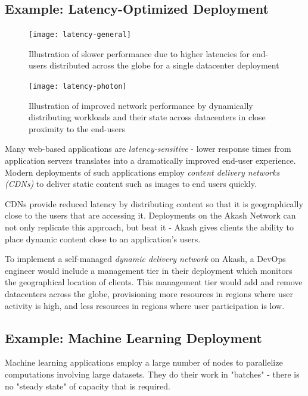 \documentclass[11pt,english]{article}
\theoremstyle{definition}
\begin{document}
\subsection{Example: Latency-Optimized Deployment}
\begin{figure}[h]
\centering
  \texttt{[image: latency-general]}
  \caption{Illustration of slower performance due to higher latencies for end-users distributed across the globe for a single datacenter deployment}
\end{figure}
\begin{figure}[h]
\centering
  \texttt{[image: latency-photon]}
  \caption{Illustration of improved network performance by dynamically distributing workloads and their state across datacenters in close proximity to the end-users}
\end{figure}
Many web-based applications are \textit{latency-sensitive} - lower response times from application servers translates into a dramatically improved end-user experience. Modern deployments of such applications employ \textit{content delivery networks (CDNs)} to deliver static content such as images to end users quickly.

CDNs provide reduced latency by distributing content so that it is geographically close to the users that are accessing it.  Deployments on the Akash Network can not only replicate this approach, but beat it - Akash gives clients the ability to place dynamic content close to an application's users.

To implement a self-managed \textit{dynamic delivery network} on Akash, a DevOps engineer would include a management tier in their deployment which monitors the geographical location of clients.  This management tier would add and remove datacenters across the globe, provisioning more resources in regions where user activity is high, and less resources in regions where user participation is low.

\subsection{Example: Machine Learning Deployment}

Machine learning applications employ a large number of nodes to parallelize computations involving large datasets.  They do their work in "batches" - there is no "steady state" of capacity that is required.
\end{document}
